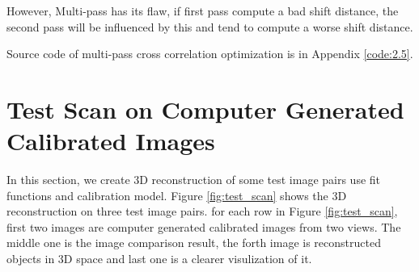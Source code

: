 However, Multi-pass has its flaw, if first pass compute a bad shift distance, the second pass will be influenced  by this and tend to compute a worse shift distance.

Source code of multi-pass cross correlation optimization is in Appendix \ref{code:2.5}.

\section{Test Scan on Computer Generated Calibrated Images}

In this section, we create 3D reconstruction of some test image pairs use fit functions and calibration model. Figure \ref{fig:test_scan} shows the 3D reconstruction on three test image pairs. for each row in Figure \ref{fig:test_scan}, first two images are computer generated calibrated images from two views. The middle one is the image comparison result, the forth image is reconstructed objects in 3D space and last one is a clearer visulization of it.

